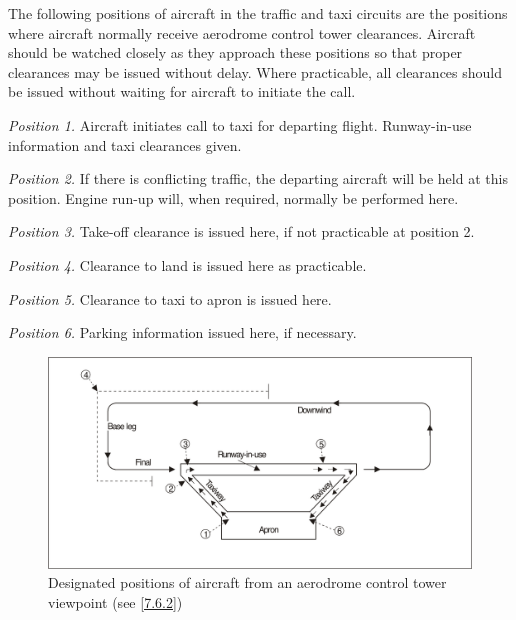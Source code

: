 The following positions of aircraft in the traffic and taxi circuits are the positions where aircraft normally receive aerodrome control tower clearances. Aircraft should be watched closely as they approach these positions so that proper clearances may be issued without delay. Where practicable, all clearances should be issued without waiting for aircraft to initiate the call.

\textit{Position 1.} Aircraft initiates call to taxi for departing flight. Runway-in-use information and taxi clearances given.

\textit{Position 2.} If there is conflicting traffic, the departing aircraft will be held at this position. Engine run-up will, when required, normally be performed here.

\textit{Position 3.} Take-off clearance is issued here, if not practicable at position 2.

\textit{Position 4.} Clearance to land is issued here as practicable.

\textit{Position 5.} Clearance to taxi to apron is issued here.

\textit{Position 6.} Parking information issued here, if necessary.


\vspace{0.5cm}
\begin{figure}[!ht]
    \centering
    \includegraphics[width=14cm]{Images/Fig 7-1.png}
    \caption[Designated positions of aircraft from an aerodrome control tower viewpoint]{Designated positions of aircraft from an aerodrome control tower viewpoint (see \ref{7.6.2})}
    \label{fig:7-1}
\end{figure}

